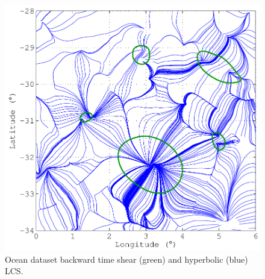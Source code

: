 \documentclass{article}
\begin{document}
\begin{figure}
\begin{center}
\includegraphics[width=\textwidth]{graphics/ocean_dataset/hyperbolic_shear_lcs_stretchline}
\end{center}
\caption{Ocean dataset backward time shear (green) and hyperbolic (blue) LCS.}
\label{f:ocean dataset hyperbolic shear lcs stretchline}
\end{figure}
\end{document}
